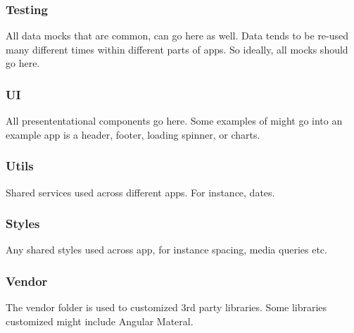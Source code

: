 \subsubsection{ Testing }
All data mocks that are common, can go here as well. Data tends to be re-used
many different times within different parts of apps. So ideally, all mocks
should go here.

\subsubsection{ UI }
All presententational components go here. Some examples of might go into an
example app is a header, footer, loading spinner, or charts.

\subsubsection{ Utils }
Shared services used across different apps. For instance, dates.

\subsubsection{ Styles }
Any shared styles used across app, for instance spacing, media queries etc.

\subsubsection{ Vendor }
The vendor folder is used to customized 3rd party libraries. Some libraries
customized might include Angular Materal.
